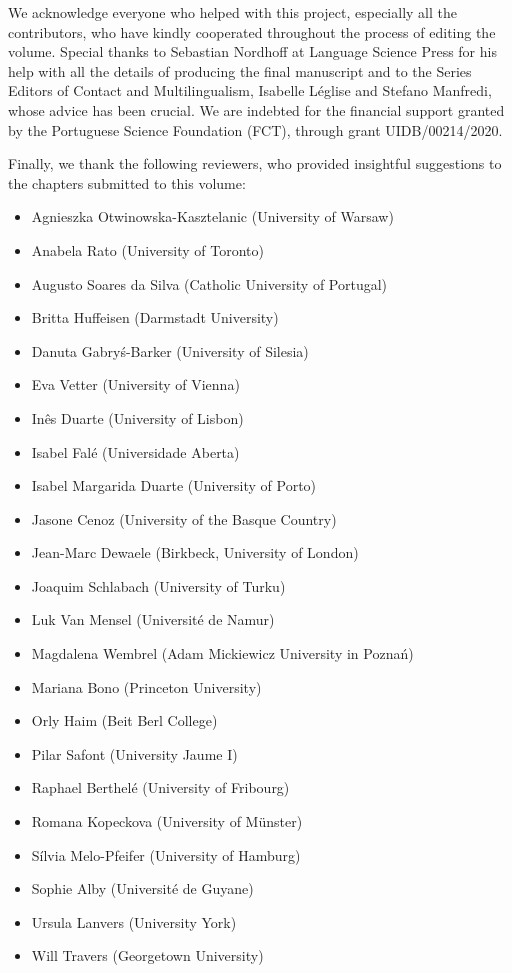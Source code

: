 
We acknowledge everyone who helped with this project, especially all the contributors, who have kindly cooperated throughout the process of editing the volume. Special thanks to Sebastian Nordhoff at Language Science Press for his help with all the details of producing the final manuscript and to the Series Editors of Contact and Multilingualism, Isabelle Léglise and Stefano Manfredi, whose advice has been crucial. We are indebted for the financial support granted by the Portuguese Science Foundation (FCT), through grant UIDB/00214/2020.

Finally, we thank the following reviewers, who provided insightful suggestions to the chapters submitted to this volume:\largerpage

\begin{itemize}[noitemsep]
\item Agnieszka Otwinowska-Kasztelanic (University of Warsaw)
\item Anabela Rato (University of Toronto)
\item Augusto Soares da Silva (Catholic University of Portugal)
\item Britta Huffeisen (Darmstadt University)
\item Danuta Gabryś-Barker (University of Silesia)
\item Eva Vetter (University of Vienna)
\item Inês Duarte (University of Lisbon)
\item Isabel Falé (Universidade Aberta) 
\item Isabel Margarida Duarte (University of Porto)
\item Jasone Cenoz (University of the Basque Country)
\item Jean-Marc Dewaele (Birkbeck, University of London)
\item Joaquim Schlabach (University of Turku)
\item Luk Van Mensel (Université de Namur)
\item Magdalena Wembrel (Adam Mickiewicz University in Poznań)
\item Mariana Bono (Princeton University)
\item Orly Haim (Beit Berl College)
\item Pilar Safont (University Jaume I)  
\item Raphael Berthelé (University of Fribourg)
\item Romana Kopeckova (University of Münster)
\item Sílvia Melo-Pfeifer (University of Hamburg)
\item Sophie Alby (Université de Guyane)
\item Ursula Lanvers (University York)
\item Will Travers (Georgetown University)
\end{itemize}
